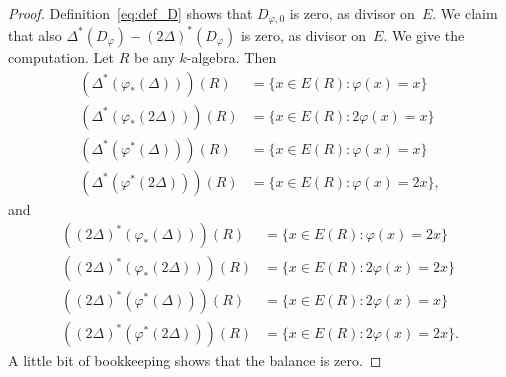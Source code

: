 \documentclass[11pt]{article}
\theoremstyle{plain}
\theoremstyle{definition}
\numberwithin{equation}{subsection}
\let\phi\varphi
\begin{document}
\begin{proof}
Definition~\eqref{eq:def_D} shows that $D_{\phi,0}$ is zero, as
divisor on~$E$. We claim that also
$\Delta^*(D_\phi)-(2\Delta)^*(D_\phi)$ is zero, as divisor on~$E$. We
give the computation. Let $R$ be any $k$-algebra. Then
\begin{align*}
(\Delta^*(\phi_*(\Delta)))(R) & = \{x\in E(R) : \phi(x)=x\}\\
(\Delta^*(\phi_*(2\Delta)))(R) & = \{x\in E(R) : 2\phi(x)=x\}\\
(\Delta^*(\phi^*(\Delta)))(R) & = \{x\in E(R) : \phi(x)=x\}\\
(\Delta^*(\phi^*(2\Delta)))(R) & = \{x\in E(R) : \phi(x)=2x\},
\end{align*}
and
\begin{align*}
((2\Delta)^*(\phi_*(\Delta)))(R) & = \{x\in E(R) : \phi(x)=2x\}\\
((2\Delta)^*(\phi_*(2\Delta)))(R) & = \{x\in E(R) : 2\phi(x)=2x\}\\
((2\Delta)^*(\phi^*(\Delta)))(R) & = \{x\in E(R) : 2\phi(x)=x\}\\
((2\Delta)^*(\phi^*(2\Delta)))(R) & = \{x\in E(R) : 2\phi(x)=2x\}.
\end{align*}
A little bit of bookkeeping shows that the balance is zero.
\end{proof}


\end{document}
